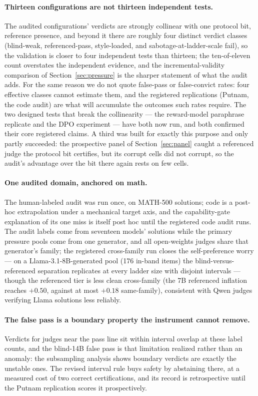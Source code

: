 \documentclass[11pt]{article}
\begin{document}
\paragraph{Thirteen configurations are not thirteen independent tests.}
The audited configurations' verdicts are strongly collinear with one protocol bit, reference presence, and beyond it there are roughly four distinct verdict classes (blind-weak, referenced-pass, style-loaded, and sabotage-at-ladder-scale fail), so the validation is closer to four independent tests than thirteen; the ten-of-eleven count overstates the independent evidence, and the incremental-validity comparison of Section~\ref{sec:pressure} is the sharper statement of what the audit adds.
For the same reason we do not quote false-pass or false-convict rates: four effective classes cannot estimate them, and the registered replications (Putnam, the code audit) are what will accumulate the outcomes such rates require.
The two designed tests that break the collinearity --- the reward-model paraphrase replicate and the DPO experiment --- have both now run, and both confirmed their core registered claims.
A third was built for exactly this purpose and only partly succeeded: the prospective panel of Section~\ref{sec:panel} caught a referenced judge the protocol bit certifies, but its corrupt cells did not corrupt, so the audit's advantage over the bit there again rests on few cells.

\paragraph{One audited domain, anchored on math.}
The human-labeled audit was run once, on \textsc{MATH-500} solutions; code is a post-hoc extrapolation under a mechanical target axis, and the capability-gate explanation of its one miss is itself post hoc until the registered code audit runs.
The audit labels come from seventeen models' solutions while the primary pressure pools come from one generator, and all open-weights judges share that generator's family; the registered cross-family run closes the self-preference worry --- on a Llama-3.1-8B-generated pool (176 in-band items) the blind-versus-referenced separation replicates at every ladder size with disjoint intervals --- though the referenced tier is less clean cross-family (the 7B referenced inflation reaches $+0.50$, against at most $+0.18$ same-family), consistent with Qwen judges verifying Llama solutions less reliably.

\paragraph{The false pass is a boundary property the instrument cannot remove.}
Verdicts for judges near the pass line sit within interval overlap at these label counts, and the blind-14B false pass is that limitation realized rather than an anomaly: the subsampling analysis shows boundary verdicts are exactly the unstable ones.
The revised interval rule buys safety by abstaining there, at a measured cost of two correct certifications, and its record is retrospective until the Putnam replication scores it prospectively.
\end{document}
